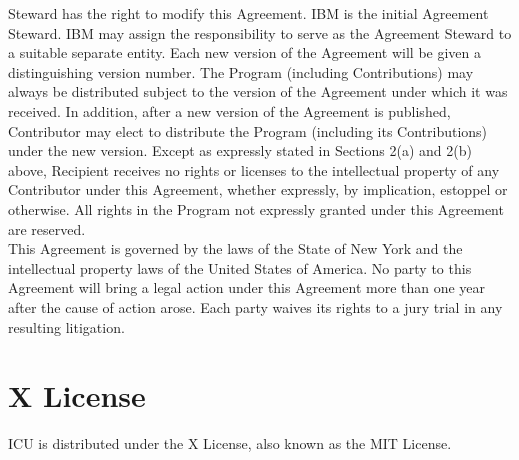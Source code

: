 {Steward has the right to modify this Agreement. IBM is the initial
Agreement Steward. IBM may assign the responsibility to serve as the
Agreement Steward to a suitable separate entity. Each new version of
the Agreement will be given a distinguishing version number. The
Program (including Contributions) may always be distributed subject to
the version of the Agreement under which it was received. In addition,
after a new version of the Agreement is published, Contributor may
elect to distribute the Program (including its Contributions) under
the new version. Except as expressly stated in Sections 2(a) and 2(b)
above, Recipient receives no rights or licenses to the intellectual
property of any Contributor under this Agreement, whether expressly,
by implication, estoppel or otherwise. All rights in the Program not
expressly granted under this Agreement are reserved.
\\[4pt]
This Agreement is governed by the laws of the State of New York and
the intellectual property laws of the United States of America. No
party to this Agreement will bring a legal action under this Agreement
more than one year after the cause of action arose. Each party waives
its rights to a jury trial in any resulting litigation.
}


\section{X License}

\setlength{\baselineskip}{\oldbaselineskip}
\noindent
ICU is distributed under the X License, also known as the MIT License.
\\


